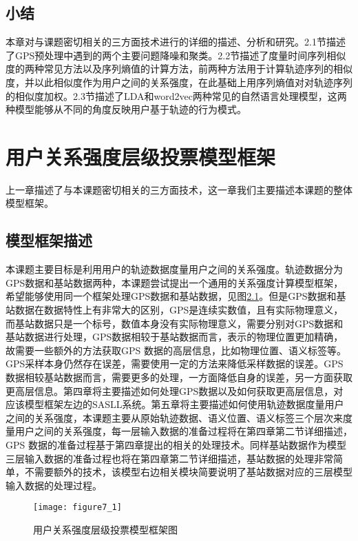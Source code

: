 \section{小结}
\label{sec:section2-4}
本章对与课题密切相关的三方面技术进行的详细的描述、分析和研究。2.1节描述了GPS预处理中遇到的两个主要问题降噪和聚类。2.2节描述了度量时间序列相似度的两种常见方法以及序列熵值的计算方法，前两种方法用于计算轨迹序列的相似度，并以此相似度作为用户之间的关系强度，在此基础上用序列熵值对对轨迹序列的相似度加权。2.3节描述了LDA和word2vec两种常见的自然语言处理模型，这两种模型能够从不同的角度反映用户基于轨迹的行为模式。
\chapter{用户关系强度层级投票模型框架}
\label{chap:chapter07}
上一章描述了与本课题密切相关的三方面技术，这一章我们主要描述本课题的整体模型框架。
\section{模型框架描述}
\label{sec:section7-1}
本课题主要目标是利用用户的轨迹数据度量用户之间的关系强度。轨迹数据分为GPS数据和基站数据两种，本课题尝试提出一个通用的关系强度计算模型框架，希望能够使用同一个框架处理GPS数据和基站数据，见图\ref{fig:7_1}。但是GPS数据和基站数据在数据特性上有非常大的区别，GPS是连续实数值，且有实际物理意义，而基站数据只是一个标号，数值本身没有实际物理意义，需要分别对GPS数据和基站数据进行处理，GPS数据相较于基站数据而言，表示的物理位置更加精确，故需要一些额外的方法获取GPS 数据的高层信息，比如物理位置、语义标签等。GPS采样本身仍然存在误差，需要使用一定的方法来降低采样数据的误差。GPS数据相较基站数据而言，需要更多的处理，一方面降低自身的误差，另一方面获取更高层信息。第四章将主要描述如何处理GPS数据以及如何获取更高层信息，对应该模型框架左边的SASLL系统。第五章将主要描述如何使用轨迹数据度量用户之间的关系强度，本课题主要从原始轨迹数据、语义位置、语义标签三个层次来度量用户之间的关系强度，每一层输入数据的准备过程将在第四章第二节详细描述，GPS 数据的准备过程基于第四章提出的相关的处理技术。同样基站数据作为模型三层输入数据的准备过程也将在第四章第二节详细描述，基站数据的处理非常简单，不需要额外的技术，该模型右边相关模块简要说明了基站数据对应的三层模型输入数据的处理过程。
\begin{figure}[htp]
\centering
\texttt{[image: figure7\_1]}
\caption{用户关系强度层级投票模型框架图}
\label{fig:7_1}
\end{figure}
